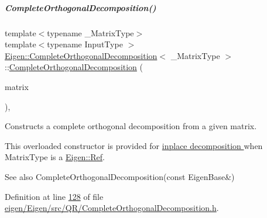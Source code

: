 \mbox{\label{group___q_r___module_a082295ba2aac35a8b8b9e2d46e1d7ce4}} 
\subparagraph{\texorpdfstring{Complete\+Orthogonal\+Decomposition()}{CompleteOrthogonalDecomposition()}\hspace{0.1cm}{\footnotesize\ttfamily [4/8]}}
{\footnotesize\ttfamily template$<$typename \+\_\+\+Matrix\+Type$>$ \\
template$<$typename Input\+Type $>$ \\
\hyperlink{group___q_r___module_class_eigen_1_1_complete_orthogonal_decomposition}{Eigen\+::\+Complete\+Orthogonal\+Decomposition}$<$ \+\_\+\+Matrix\+Type $>$\+::\hyperlink{group___q_r___module_class_eigen_1_1_complete_orthogonal_decomposition}{Complete\+Orthogonal\+Decomposition} (\begin{DoxyParamCaption}\item[{\hyperlink{group___core___module_struct_eigen_1_1_eigen_base}{Eigen\+Base}$<$ Input\+Type $>$ \&}]{matrix }\end{DoxyParamCaption})\hspace{0.3cm}{\ttfamily [inline]}, {\ttfamily [explicit]}}



Constructs a complete orthogonal decomposition from a given matrix. 

This overloaded constructor is provided for \hyperlink{group___inplace_decomposition}{inplace decomposition } when {\ttfamily Matrix\+Type} is a \hyperlink{group___core___module_class_eigen_1_1_ref}{Eigen\+::\+Ref}.

\begin{DoxySeeAlso}{See also}
Complete\+Orthogonal\+Decomposition(const Eigen\+Base\&) 
\end{DoxySeeAlso}


Definition at line \hyperlink{eigen_2_eigen_2src_2_q_r_2_complete_orthogonal_decomposition_8h_source_l00128}{128} of file \hyperlink{eigen_2_eigen_2src_2_q_r_2_complete_orthogonal_decomposition_8h_source}{eigen/\+Eigen/src/\+Q\+R/\+Complete\+Orthogonal\+Decomposition.\+h}.

